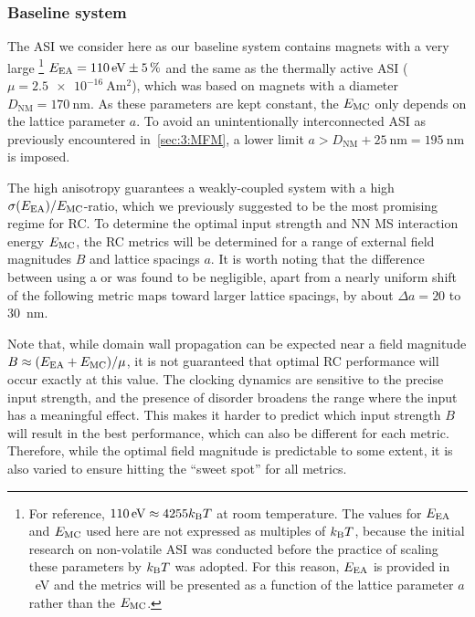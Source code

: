 \subsubsection{Baseline system}
The ASI we consider here as our baseline system contains magnets with a very large \footnote{
	For reference, $\SI{110}{\electronvolt} \approx 4255\kBT$ at room temperature.
	The values for $E_\mathrm{EA}$ and $E_\mathrm{MC}$ used here are not expressed as multiples of $\kBT$, because the initial research on non-volatile ASI was conducted before the practice of scaling these parameters by $\kBT$ was adopted.
	For this reason, $E_\mathrm{EA}$ is provided in \SI{}{\electronvolt} and the metrics will be presented as a function of the lattice parameter $a$ rather than the  $E_\mathrm{MC}$.
} $E_\mathrm{EA} = \SI{110}{\electronvolt} \pm \SI{5}{\percent}$ and the same  as the thermally active ASI ($\mu = \SI{2.5e-16}{\ampere\metre\squared}$), which was based on magnets with a diameter $D_\mathrm{NM} = \SI{170}{\nano\metre}$.
As these parameters are kept constant, the  $E_\mathrm{MC}$ only depends on the lattice parameter $a$.
To avoid an unintentionally interconnected ASI as previously encountered in~\cref{sec:3:MFM}, a lower limit $a > D_\mathrm{NM} + \SI{25}{\nano\metre} = \SI{195}{\nano\metre}$ is imposed. \par
The high anisotropy guarantees a weakly-coupled system with a high $\sigma(E_\mathrm{EA})/E_\mathrm{MC}$-ratio, which we previously suggested to be the most promising regime for RC.
To determine the optimal input strength and NN MS interaction energy $E_\mathrm{MC}$, the RC metrics will be determined for a range of external field magnitudes $B$ and lattice spacings $a$.
It is worth noting that the difference between using a  or  was found to be negligible, apart from a nearly uniform shift of the following metric maps toward larger lattice spacings, by about $\Delta a = 20$ to \SI{30}{\nano\metre}. \par %
Note that, while domain wall propagation can be expected near a field magnitude $B \approx (E_\mathrm{EA} + E_\mathrm{MC})/\mu$, it is not guaranteed that optimal RC performance will occur exactly at this value.
The clocking dynamics are sensitive to the precise input strength, and the presence of disorder broadens the range where the input has a meaningful effect.
This makes it harder to predict which input strength $B$ will result in the best performance, which can also be different for each metric.
Therefore, while the optimal field magnitude is predictable to some extent, it is also varied to ensure hitting the ``sweet spot'' for all metrics.

